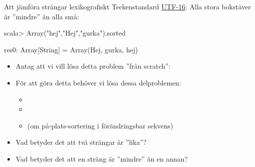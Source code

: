 

\ifkompendium\else


\begin{Slide}{Att jämföra strängar lexikografiskt}\SlideFontSmall
Teckenstandard \href{https://sv.wikipedia.org/wiki/UTF-16}{UTF-16}: Alla stora bokstäver är ''mindre'' än alla små:
\begin{REPLnonum}
scala> Array("hej","Hej","gurka").sorted
\end{REPLnonum}
\pause\vspace{-1.2em}
\begin{REPLnonum}
res0: Array[String] = Array(Hej, gurka, hej)\end{REPLnonum}
\pause
\begin{itemize}
\item Antag att vi vill lösa detta problem ''från scratch'': \\  
\item För att göra detta behöver vi lösa dessa delproblemen: 
\begin{itemize}
\item {} 
\item {}
\item {} (om på-plats-sortering i förändringsbar sekvens)
\end{itemize}
\item Vad betyder det att två strängar är ''lika''?

\item Vad betyder det att en sträng är ''mindre'' än en annan?
\end{itemize}

\end{Slide}

